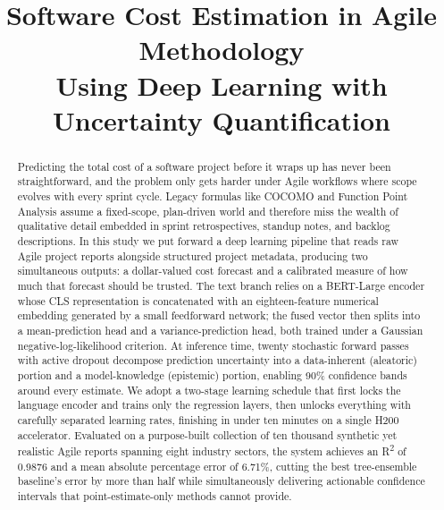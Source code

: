\documentclass[conference]{IEEEtran}
\begin{document}
\title{Software Cost Estimation in Agile Methodology\\Using Deep Learning with Uncertainty Quantification}

\author{
\and
{}
}

\maketitle

\begin{abstract}
Predicting the total cost of a software project before it wraps up has never been straightforward, and the problem only gets harder under Agile workflows where scope evolves with every sprint cycle. Legacy formulas like COCOMO and Function Point Analysis assume a fixed-scope, plan-driven world and therefore miss the wealth of qualitative detail embedded in sprint retrospectives, standup notes, and backlog descriptions. In this study we put forward a deep learning pipeline that reads raw Agile project reports alongside structured project metadata, producing two simultaneous outputs: a dollar-valued cost forecast and a calibrated measure of how much that forecast should be trusted. The text branch relies on a BERT-Large encoder whose CLS representation is concatenated with an eighteen-feature numerical embedding generated by a small feedforward network; the fused vector then splits into a mean-prediction head and a variance-prediction head, both trained under a Gaussian negative-log-likelihood criterion. At inference time, twenty stochastic forward passes with active dropout decompose prediction uncertainty into a data-inherent (aleatoric) portion and a model-knowledge (epistemic) portion, enabling 90\% confidence bands around every estimate. We adopt a two-stage learning schedule that first locks the language encoder and trains only the regression layers, then unlocks everything with carefully separated learning rates, finishing in under ten minutes on a single H200 accelerator. Evaluated on a purpose-built collection of ten thousand synthetic yet realistic Agile reports spanning eight industry sectors, the system achieves an R\textsuperscript{2} of 0.9876 and a mean absolute percentage error of 6.71\%, cutting the best tree-ensemble baseline's error by more than half while simultaneously delivering actionable confidence intervals that point-estimate-only methods cannot provide.
\end{abstract}
\end{document}
